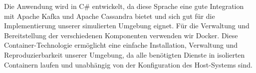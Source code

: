 Die Anwendung wird in C\# entwickelt, da diese Sprache eine gute Integration mit Apache Kafka und Apache Cassandra bietet und sich gut für die Implementierung unserer simulierten Umgebung eignet. Für die Verwaltung und Bereitstellung der verschiedenen Komponenten verwenden wir Docker. Diese Container-Technologie ermöglicht eine einfache Installation, Verwaltung und Reproduzierbarkeit unserer Umgebung, da alle benötigten Dienste in isolierten Containern laufen und unabhängig von der Konfiguration des Host-Systems sind.
